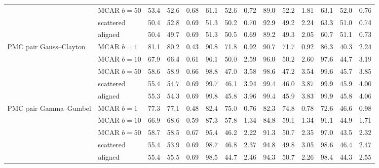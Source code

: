 \begin{table}[htbp]
\begin{tabular}{llrrrrrrrrrrrr}
     & MCAR $b{=}50$ & 53.4 & 52.6 & 0.68 & 61.1 & 52.6 & 0.72 & 89.0 & 52.2 & 1.81 & 63.1 & 52.0 & 0.76 \\
     & scattered & 50.4 & 52.8 & 0.69 & 51.3 & 50.2 & 0.70 & 92.9 & 49.2 & 2.24 & 63.3 & 51.0 & 0.74 \\
     & aligned & 50.4 & 49.7 & 0.69 & 51.3 & 50.5 & 0.69 & 89.2 & 49.3 & 2.05 & 60.7 & 51.1 & 0.73 \\
    \addlinespace
    PMC pair Gauss--Clayton & MCAR $b{=}1$ & 81.1 & 80.2 & 0.43 & 90.8 & 71.8 & 0.92 & 90.7 & 71.7 & 0.92 & 86.3 & 40.3 & 2.24 \\
     & MCAR $b{=}10$ & 67.9 & 66.4 & 0.61 & 96.1 & 50.0 & 2.59 & 96.0 & 50.2 & 2.60 & 97.6 & 44.7 & 3.19 \\
     & MCAR $b{=}50$ & 58.6 & 58.9 & 0.66 & 98.8 & 47.0 & 3.58 & 98.6 & 47.2 & 3.54 & 99.6 & 45.7 & 3.85 \\
     & scattered & 55.4 & 54.7 & 0.69 & 99.7 & 46.1 & 3.94 & 99.4 & 46.0 & 3.87 & 99.9 & 45.9 & 4.00 \\
     & aligned & 55.3 & 54.3 & 0.69 & 99.8 & 45.8 & 3.96 & 99.4 & 45.9 & 3.83 & 99.9 & 45.8 & 4.06 \\
    \addlinespace
    PMC pair Gamma--Gumbel & MCAR $b{=}1$ & 77.3 & 77.1 & 0.48 & 82.4 & 75.0 & 0.76 & 82.3 & 74.8 & 0.78 & 72.6 & 46.6 & 0.98 \\
     & MCAR $b{=}10$ & 66.9 & 68.6 & 0.59 & 87.3 & 57.8 & 1.34 & 84.8 & 59.1 & 1.34 & 91.1 & 44.9 & 1.71 \\
     & MCAR $b{=}50$ & 58.7 & 58.5 & 0.67 & 95.4 & 46.2 & 2.22 & 91.3 & 50.7 & 2.35 & 97.0 & 43.5 & 2.32 \\
     & scattered & 55.4 & 53.9 & 0.69 & 98.7 & 46.8 & 2.37 & 94.8 & 49.8 & 3.05 & 98.6 & 46.4 & 2.47 \\
     & aligned & 55.4 & 55.5 & 0.69 & 98.5 & 44.7 & 2.46 & 94.3 & 50.7 & 2.26 & 98.4 & 44.3 & 2.55 \\
    \bottomrule
  \end{tabular}
\end{table}
